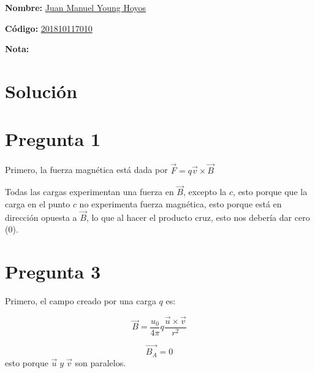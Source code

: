 \documentclass{exam}
\begin{document}
\begin{center}
\end{center}

\textbf{Nombre:} \underline{Juan Manuel Young Hoyos} \enspace\hrulefill

\textbf{Código:} \underline{201810117010} \enspace\hrulefill

\textbf{Nota:\enspace\hrulefill}

    \section*{Solución}

    \section*{Pregunta 1}

    Primero, la fuerza magnética está dada por $\overrightarrow{F} = q \overrightarrow{v} \times \overrightarrow{B}$

    Todas las cargas experimentan una fuerza en $\overrightarrow{B}$, excepto la $c$, esto porque que la carga en el punto
    $c$ no experimenta fuerza magnética, esto porque está en dirección
    opuesta a $\overrightarrow{B}$, lo que al hacer el producto cruz, esto nos debería dar cero ($0$).

    \section*{Pregunta 3}

    Primero, el campo creado por una carga $q$ es:

    \[ \overrightarrow{B} = \frac{u_0}{4\pi} q \frac{\overrightarrow{u} \times \overrightarrow{v}}{r^2} \]
    
    \[ \overrightarrow{B_A} = 0\]
    esto porque $ \overrightarrow{u} \;y\; \overrightarrow{v} $ son paralelos.
\end{document}
